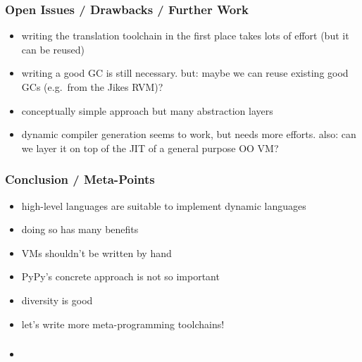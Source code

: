 \documentclass[utf8x]{beamer}
\begin{document}
\begin{frame}
  \frametitle{Open Issues / Drawbacks / Further Work}
  \begin{itemize}
  \item
    writing the translation toolchain in the first place takes lots of effort
    (but it can be reused)
  \item
    writing a good GC is still necessary. but: maybe we can reuse existing good
    GCs (e.g.\ from the Jikes RVM)?
  \item
    conceptually simple approach but many abstraction layers
  \item
    dynamic compiler generation seems to work, but needs more efforts.
    also: can we layer it on top of the JIT of a general purpose OO VM?
  \end{itemize}
\end{frame}

\begin{frame}
  \frametitle{Conclusion / Meta-Points}
  \begin{itemize}
  \item
    high-level languages are suitable to implement dynamic languages
  \item
    doing so has many benefits
  \item
    VMs shouldn't be written by hand
  \item
    PyPy's concrete approach is not so important
  \item
    diversity is good
  \item
    let's write more meta-programming toolchains!
  \end{itemize}
\end{frame}

\begin{frame}
  \frametitle{}
  \begin{itemize}
  \item
  \end{itemize}
\end{frame}
\end{document}
